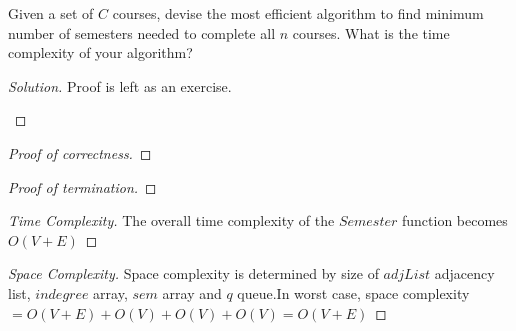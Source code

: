 \begin{solution}{2.2}
    \begin{question}
        Given a set of $C$ courses, devise the most efficient algorithm to find minimum number of semesters needed to complete all $n$ courses. What is the time complexity of your algorithm? 
    \end{question}
    \tcblower{}
    \begin{proof}[Solution]
        Proof is left as an exercise.
        
        
        \begin{algorithm}
        \caption{Least number of semesters for completion}
        \begin{algorithmic}
         
        \State{}
        \EndProcedure
        \end{algorithmic}
        \end{algorithm}
    \end{proof}
    \begin{proof}[Proof of correctness]
    \end{proof}
    \begin{proof}[Proof of termination]
        
    \end{proof}
    \begin{proof}[Time Complexity]
        The overall time complexity of the $Semester$ function becomes $O(V+E)$
    \end{proof}
    \begin{proof}[Space Complexity]
        Space complexity is determined by size of $adjList$ adjacency list, $indegree$ array, $sem$ array and $q$ queue.In worst case, space complexity $=O(V+E)+O(V)+O(V)+O(V)=O(V+E)$
    \end{proof}
\end{solution}
